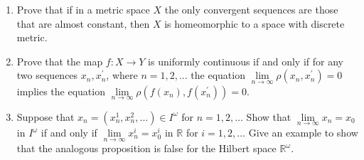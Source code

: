 \begin{enumerate}[label={(\alph*)}]
	\item Prove that if in a metric space \( X \) the only convergent sequences are those that are almost constant, then \( X \) is homeomorphic to a space with discrete metric.
	\item Prove that the map \( f: X \to Y \) is uniformly continuous if and only if for any two sequences \( x_{n}, x^{\prime}_{n} \), where \( n = 1, 2, \ldots \) the equation \( \lim\limits_{n\to\infty} \rho(x_{n}, x^{\prime}_{n}) = 0 \) implies the equation \( \lim\limits_{n\to\infty} \rho(f(x_{n}), f(x^{\prime}_{n})) = 0 \).
	\item Suppose that \( x_{n} = (x_{n}^{1}, x_{n}^{2}, \ldots) \in I^{\omega} \) for \( n = 1, 2, \ldots \) Show that \( \lim\limits_{n\to\infty} x_{n} = x_{0} \) in \( I^{\omega} \) if and only if \( \lim\limits_{n\to\infty} x^{i}_{n} = x^{i}_{0} \) in \( \mathbb{R} \) for \( i = 1, 2, \ldots \) Give an example to show that the analogous proposition is false for the Hilbert space \( \mathbb{R}^{\omega} \).
\end{enumerate}

